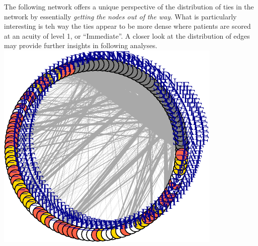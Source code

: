 \documentclass[]{elsarticle} %
\makeatletter
\def\maxwidth{\ifdim\Gin@nat@width>\linewidth\linewidth
\else\Gin@nat@width\fi}
\let\Oldincludegraphics\includegraphics
\renewcommand{\includegraphics}[1]{\Oldincludegraphics[width=\maxwidth]{#1}}
\makeatother
\begin{document}
The following network offers a unique perspective of the distribution of
ties in the network by essentially \emph{getting the nodes out of the
way}. What is particularly interesting is teh way the ties appear to be
more dense where patients are scored at an acuity of level 1, or
``Immediate''. A closer look at the distribution of edges may provide
further insights in following analyses.
\includegraphics{Flynn_Project_files/figure-latex/shift10 circle-1.pdf}
\end{document}
